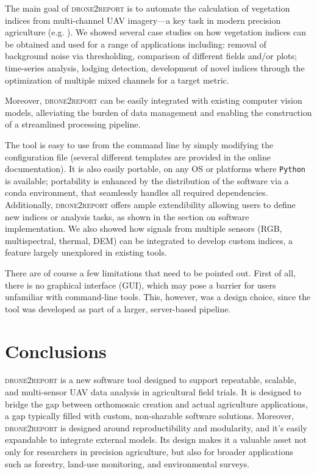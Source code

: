 \documentclass[drones,technicalnote,accept,pdftex,moreauthors]{Definitions/mdpi}
\begin{document}
The main goal of \textsc{drone2report} is to automate the calculation of vegetation indices from multi-channel UAV imagery—a key task in modern precision agriculture (e.g. \cite{candiago2015evaluating, radovcaj2023state, velez2023beyond}).
We showed several case studies on how vegetation indices can be obtained and used for a range of applications including: removal of background noise via thresholding, comparison of different fields and/or plots; time-series analysis, lodging detection, development of novel indices through the optimization of multiple mixed channels for a target metric. 

Moreover, \textsc{drone2report} can be easily integrated with existing computer vision models, alleviating the burden of data management and enabling the construction of a streamlined processing pipeline.

The tool is easy to use from the command line by simply modifying the configuration file (several different templates are provided in the online documentation). 
It is also easily portable, on any OS or platforms where \texttt{Python} is available; portability is enhanced by the distribution of the software via a conda environment, that seamlessly handles all required dependencies. 
Additionally, \textsc{drone2report} offers ample extendibility allowing users to define new indices or analysis tasks, as shown in the section on software implementation. We also showed how signals from multiple sensors (RGB, multispectral, thermal, DEM) can be integrated to develop custom indices, a feature largely unexplored in existing tools.

There are of course a few limitations that need to be pointed out. 
First of all, there is no graphical interface (GUI), which may pose a barrier for users unfamiliar with command-line tools. This, however, was a design choice, since the tool was developed as part of a larger, server-based pipeline.


\section{Conclusions}
\label{conclusions}

\textsc{drone2report} is a new software tool designed to support repeatable, scalable, and multi-sensor UAV data analysis in agricultural field trials. It is designed to bridge the gap between orthomosaic creation and actual agriculture applications, a gap typically filled with custom, non-sharable software solutions. Moreover, \textsc{drone2report} is designed around reproductibility and modularity, and it's easily expandable to integrate external models. Its design makes it a valuable asset not only for researchers in precision agriculture, but also for broader applications such as forestry, land-use monitoring, and environmental surveys.
\end{document}

